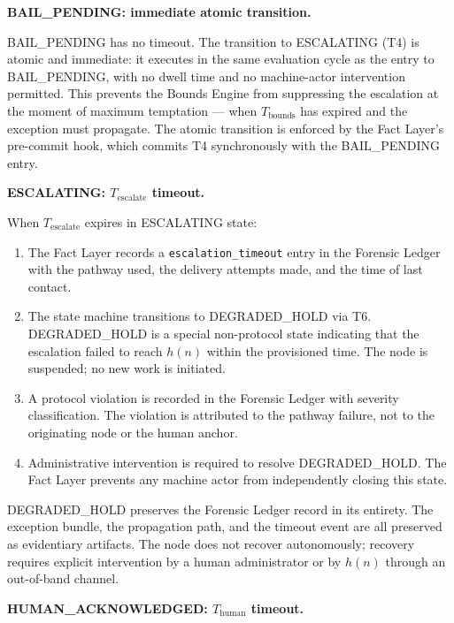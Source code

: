 \bigskip
\noindent\textbf{BAIL\_PENDING: immediate atomic transition.}

BAIL\_PENDING has no timeout. The transition to ESCALATING (T4) is atomic and immediate: it executes in the same evaluation cycle as the entry to BAIL\_PENDING, with no dwell time and no machine-actor intervention permitted. This prevents the Bounds Engine from suppressing the escalation at the moment of maximum temptation --- when $T_{\text{bounds}}$ has expired and the exception must propagate. The atomic transition is enforced by the Fact Layer's pre-commit hook, which commits T4 synchronously with the BAIL\_PENDING entry.

\bigskip
\noindent\textbf{ESCALATING: $T_{\text{escalate}}$ timeout.}

When $T_{\text{escalate}}$ expires in ESCALATING state:
\begin{enumerate}\itemsep=0pt
\item The Fact Layer records a \texttt{escalation\_timeout} entry in the Forensic Ledger with the pathway used, the delivery attempts made, and the time of last contact.
\item The state machine transitions to DEGRADED\_HOLD via T6. DEGRADED\_HOLD is a special non-protocol state indicating that the escalation failed to reach $h(n)$ within the provisioned time. The node is suspended; no new work is initiated.
\item A protocol violation is recorded in the Forensic Ledger with severity classification. The violation is attributed to the pathway failure, not to the originating node or the human anchor.
\item Administrative intervention is required to resolve DEGRADED\_HOLD. The Fact Layer prevents any machine actor from independently closing this state.
\end{enumerate}

DEGRADED\_HOLD preserves the Forensic Ledger record in its entirety. The exception bundle, the propagation path, and the timeout event are all preserved as evidentiary artifacts. The node does not recover autonomously; recovery requires explicit intervention by a human administrator or by $h(n)$ through an out-of-band channel.

\bigskip
\noindent\textbf{HUMAN\_ACKNOWLEDGED: $T_{\text{human}}$ timeout.}

